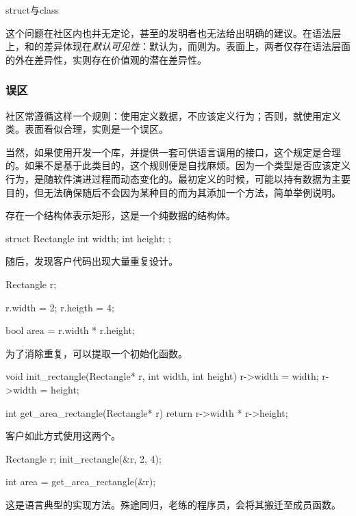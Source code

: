 \begin{content}
\begin{episode}{struct与class}
\begin{content}
这个问题在社区内也并无定论，甚至\cpp{}的发明者也无法给出明确的建议。在语法层上，和的差异体现在\emph{默认可见性}：默认为，而则为。表面上，两者仅存在语法层面的外在差异性，实则存在价值观的潜在差异性。

\subsubsection{误区}

社区常遵循这样一个规则：使用定义数据，不应该定义行为；否则，就使用定义类。表面看似合理，实则是一个误区。

当然，如果使用\cpp{}开发一个库，并提供一套可供\clang{}语言调用的接口，这个规定是合理的。如果不是基于此类目的，这个规则便是自找麻烦。因为一个类型是否应该定义行为，是随软件演进过程而动态变化的。最初定义的时候，可能以持有数据为主要目的，但无法确保随后不会因为某种目的而为其添加一个方法，简单举例说明。

存在一个结构体表示矩形，这是一个纯数据的结构体。

\begin{c++}
struct Rectangle {
  int width;
  int height;
};
\end{c++}

随后，发现客户代码出现大量重复设计。

\begin{c++}
Rectangle r;

r.width = 2;
r.heigth = 4;

bool area = r.width * r.height;
\end{c++}

为了消除重复，可以提取一个初始化函数。

\begin{c++}
void init_rectangle(Rectangle* r, int width, int height) {
  r->width = width;
  r->width = height;
}

int get_area_rectangle(Rectangle* r) {
  return r->width * r->height;
}
\end{c++}

客户如此方式使用这两个。

\begin{c++}
Rectangle r;
init_rectangle(&r, 2, 4);

int area = get_area_rectangle(&r);
\end{c++}

这是\clang{}语言典型的实现方法。殊途同归，老练的程序员，会将其搬迁至成员函数。


\end{content}
\end{episode}
\end{content}
